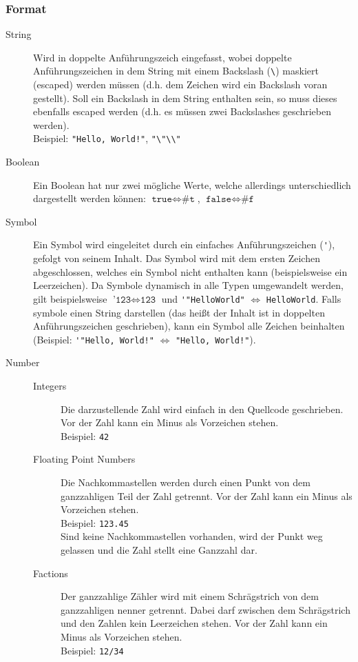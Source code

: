 			\subsubsection{Format}
				\begin{description}
					\item[String] Wird in doppelte Anführungszeich eingefasst, wobei doppelte Anführungszeichen in dem String mit einem Backslash (\texttt{\textbackslash}) maskiert (escaped) werden müssen (d.h. dem Zeichen wird ein Backslash voran gestellt). Soll ein Backslash in dem String enthalten sein, so muss dieses ebenfalls escaped werden (d.h. es müssen zwei Backslashes geschrieben werden). \\ Beispiel: \verb$"Hello, World!"$, \verb$"\"\\"$
					\item[Boolean] Ein Boolean hat nur zwei mögliche Werte, welche allerdings unterschiedlich dargestellt werden können: $ \texttt{true} \iff \texttt{\#t} $, $ \texttt{false} \iff \texttt{\#f} $
					\item[Symbol] Ein Symbol wird eingeleitet durch ein einfaches Anführungszeichen (\verb$'$), gefolgt von seinem Inhalt. Das Symbol wird mit dem ersten Zeichen abgeschlossen, welches ein Symbol nicht enthalten kann (beispielsweise ein Leerzeichen). Da Symbole dynamisch in alle Typen umgewandelt werden, gilt beispielsweise $ \texttt{'123} \iff \texttt{123} $
						und \verb$'"HelloWorld"$ $ \iff $ \verb$HelloWorld$. Falls symbole einen String darstellen (das heißt der Inhalt ist in doppelten Anführungszeichen geschrieben), kann ein Symbol alle Zeichen beinhalten (Beispiel: \verb$'"Hello, World!"$ $ \iff $ \verb$"Hello, World!"$).
					\item[Number]
						\begin{description}
							\item[Integers] Die darzustellende Zahl wird einfach in den Quellcode geschrieben. Vor der Zahl kann ein Minus als Vorzeichen stehen. \\ Beispiel: \texttt{42}
							\item[Floating Point Numbers] Die Nachkommastellen werden durch einen Punkt von dem ganzzahligen Teil der Zahl getrennt. Vor der Zahl kann ein Minus als Vorzeichen stehen. \\ Beispiel: \texttt{123.45} \\ Sind keine Nachkommastellen vorhanden, wird der Punkt weg gelassen und die Zahl stellt eine Ganzzahl dar.
							\item[Factions] Der ganzzahlige Zähler wird mit einem Schrägstrich von dem ganzzahligen nenner getrennt. Dabei darf zwischen dem Schrägstrich und den Zahlen kein Leerzeichen stehen. Vor der Zahl kann ein Minus als Vorzeichen stehen. \\ Beispiel: \texttt{12/34}

\end{description}
\end{description}
